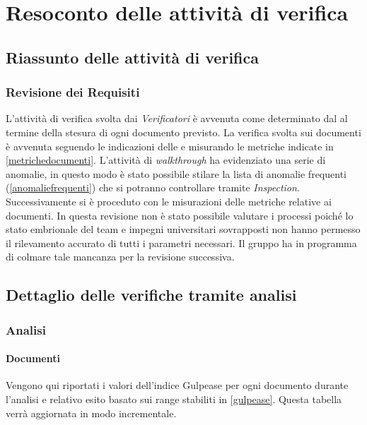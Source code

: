 \section{Resoconto delle attività di verifica}

	\subsection{Riassunto delle attività di verifica}
	\label{RiassuntoAttivitaVerifica}
	
	 	\subsubsection{Revisione dei Requisiti}
	 	L'attività di verifica svolta dai \emph{Verificatori} è avvenuta come determinato dal \PianoDiProgetto{} al termine della stesura di ogni documento previsto. La verifica svolta sui documenti è avvenuta seguendo le indicazioni delle \NormeDiProgetto{} e misurando le metriche indicate in \ref{metrichedocumenti}. L'attività di \emph{walkthrough} ha evidenziato una serie di anomalie, in questo modo è stato possibile stilare la lista di anomalie frequenti (\ref{anomaliefrequenti}) che si potranno controllare tramite \emph{Inspection}. Successivamente si è proceduto con le misurazioni delle metriche relative ai documenti.
In questa revisione non è stato possibile valutare i processi poiché lo stato embrionale del team e   impegni universitari sovrapposti non hanno permesso il rilevamento accurato di tutti i parametri necessari. Il gruppo ha in programma di colmare tale mancanza per la revisione successiva.
	 
	 \subsection{Dettaglio delle verifiche tramite analisi}
	 \label{DettaglioVerificheAnalisi}
	 	\subsubsection{Analisi}
	 	\paragraph{Documenti}
	 	Vengono qui riportati i valori dell’indice Gulpease per ogni documento durante l'analisi e relativo esito basato sui range stabiliti in \ref{gulpease}. Questa tabella verrà aggiornata in modo incrementale. 	
	
